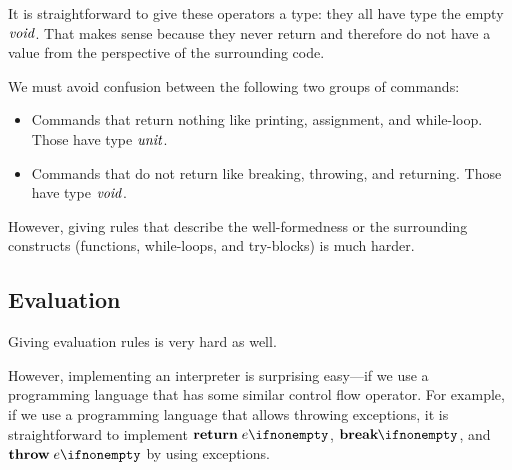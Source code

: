 It is straightforward to give these operators a type: they all have type the empty $\mathit{void}$.
That makes sense because they never return and therefore do not have a value from the perspective of the surrounding code.

We must avoid confusion between the following two groups of commands:
\begin{itemize}
\item Commands that return nothing like printing, assignment, and while-loop. Those have type $\mathit{unit}$.
\item Commands that do not return like breaking, throwing, and returning. Those have type $\mathit{void}$.
\end{itemize}

However, giving rules that describe the well-formedness or the surrounding constructs (functions, while-loops, and try-blocks) is much harder.

\subsection{Evaluation}

Giving evaluation rules is very hard as well.

However, implementing an interpreter is surprising easy---if we use a programming language that has some similar control flow operator.
For example, if we use a programming language that allows throwing exceptions, it is straightforward to implement $\areturn{e}$, $\abreak$, and $\athrow{e}$ by using exceptions.